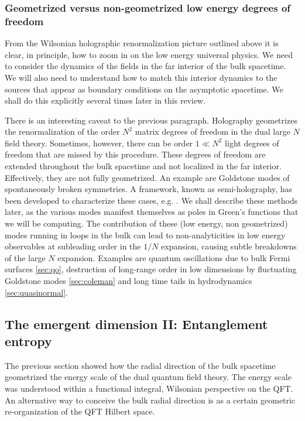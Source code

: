 \documentclass[10pt, oneside]{book}
\begin{document}
\begin{doublespace}
\subsubsection{Geometrized versus non-geometrized low energy degrees of freedom}

From the Wilsonian holographic renormalization picture outlined above it is clear, in principle, how to zoom in on the low energy universal physics. We need to consider the dynamics of the fields in the far interior of the bulk spacetime. We will also need to understand how to match this interior dynamics to the sources that appear as boundary conditions on the asymptotic spacetime. We shall do this explicitly several times later in this review.

There is an interesting caveat to the previous paragraph. Holography geometrizes the renormalization of the order $N^2$ matrix degrees of freedom in the dual large $N$ field theory. Sometimes, however, there can be order $1 \ll N^2$ light degrees of freedom that are missed by this procedure. These degrees of freedom are extended throughout the bulk spacetime and not localized in the far interior. Effectively, they are not fully geometrized. An example are Goldstone modes of spontaneously broken symmetries. A framework, known as semi-holography, has been developed to characterize these cases, e.g. \cite{Faulkner:2010tq, Nickel:2010pr, Faulkner:2010jy}. We shall describe these methods later, as the various modes manifest themselves as poles in Green's functions that we will be computing. The contribution of these (low energy, non geometrized) modes running in loops in the bulk can lead to non-analyticities in low energy observables at subleading order in the $1/N$ expansion, causing subtle breakdowns of the large $N$ expansion. Examples are quantum oscillations due to bulk Fermi surfaces \ref{sec:qo}, destruction of long-range order in low dimensions by fluctuating Goldstone modes \ref{sec:coleman} and long time tails in hydrodynamics \ref{sec:quasinormal}.

\subsection{The emergent dimension II: Entanglement entropy}\label{sec:EE}

The previous section showed how the radial direction of the bulk spacetime geometrized the energy scale of the dual quantum field theory. The energy scale was understood within a functional integral, Wilsonian perspective on the QFT. An alternative way to conceive the bulk radial direction is as a certain geometric re-organization of the QFT Hilbert space.


\end{doublespace}
\end{document}
